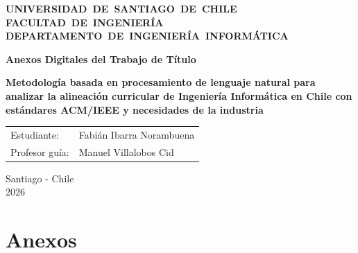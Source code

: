 \documentclass[12pt,letterpaper]{article}
\newcommand{\appendixnumberline}[1]{\makebox[5.5em][l]{#1}}
\begin{document}
\newpage
\thispagestyle{empty}

\begin{center}
	{\bf \mbox{\large UNIVERSIDAD DE SANTIAGO DE CHILE}}\\
	{\bf \mbox{FACULTAD DE INGENIERÍA}}\\
	{\bf \mbox{DEPARTAMENTO DE INGENIERÍA INFORMÁTICA}}\\
\end{center}

\vspace{4cm}
\begin{center}
	\Large
	\textbf{Anexos Digitales del Trabajo de Título}
	
	\vspace{1cm}
	\large
	\textbf{Metodología basada en procesamiento de lenguaje natural para analizar la alineación curricular de Ingeniería Informática en Chile con estándares ACM/IEEE y necesidades de la industria}
\end{center}

\vspace*{2.5cm}
\begin{flushright}
	\begin{tabular}[t]{l l}
		Estudiante:
		               & Fabián Ibarra Norambuena \\
		Profesor guía: & Manuel Villalobos Cid    \\
	\end{tabular}
\end{flushright}
\begin{center}
	\vspace{2.5cm}
	Santiago - Chile\\
	2026
\end{center}

\newpage
{}
\tableofcontents

\newpage
{}
\setcounter{page}{1}

\section*{Anexos}
\setcounter{subsection}{0}
\renewcommand{\thesubsection}{Anexo \Alph{subsection}}
\renewcommand{\theHsubsection}{Anexo.\arabic{subsection}}




\newpage
{}


\end{document}
